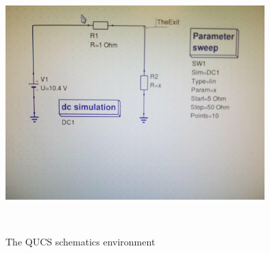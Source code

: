 \documentclass{report}
\begin{document}
\begin{figure}[!tb]
\includegraphics[width=10cm,height=10cm,keepaspectratio]{dc-sim.jpg}
\caption{The QUCS schematics environment}
\end{figure}
\end{document}
